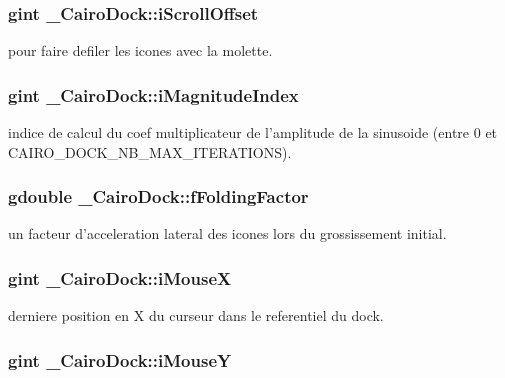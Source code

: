 \subsubsection{\setlength{\rightskip}{0pt plus 5cm}gint {\bf \_\-CairoDock::iScrollOffset}}\label{struct__CairoDock_b90ff76504c9f131b1dd325b25edcc33}


pour faire defiler les icones avec la molette. 

\subsubsection{\setlength{\rightskip}{0pt plus 5cm}gint {\bf \_\-CairoDock::iMagnitudeIndex}}\label{struct__CairoDock_ceb27171201bb6aad3362db144eb062a}


indice de calcul du coef multiplicateur de l'amplitude de la sinusoide (entre 0 et CAIRO\_\-DOCK\_\-NB\_\-MAX\_\-ITERATIONS). 

\subsubsection{\setlength{\rightskip}{0pt plus 5cm}gdouble {\bf \_\-CairoDock::fFoldingFactor}}\label{struct__CairoDock_baa79bb3acc6fcf84a01d1f70fe1b829}


un facteur d'acceleration lateral des icones lors du grossissement initial. 

\subsubsection{\setlength{\rightskip}{0pt plus 5cm}gint {\bf \_\-CairoDock::iMouseX}}\label{struct__CairoDock_cdb944e2110e7dc7df9e895663980a73}


derniere position en X du curseur dans le referentiel du dock. 

\subsubsection{\setlength{\rightskip}{0pt plus 5cm}gint {\bf \_\-CairoDock::iMouseY}}\label{struct__CairoDock_a7ce6faa5f3cb3d1ebf8a9954dd1a145}


